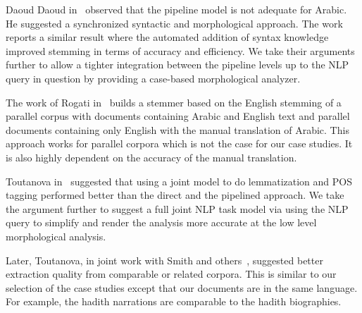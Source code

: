 \documentclass[12pt]{article}
\newcommand{\noTrNoVocRL}[1]{\novocalize\transfalse\RL{#1}\transtrue\vocalize}
\begin{document}
Daoud Daoud in~\cite{Dao09} observed that the pipeline model is not 
adequate for Arabic. 
He suggested a synchronized syntactic and morphological
approach. 
The work~\cite{AlSham08} reports a similar result where
the automated addition of syntax knowledge improved stemming
in terms of accuracy and efficiency. 
We take their arguments further to 
allow a tighter integration between the pipeline
levels up to the NLP query in question by providing a case-based
morphological analyzer. 

The work of Rogati in~\cite{Rog03} builds a stemmer based on
the English stemming of 
a parallel corpus with documents containing Arabic and English
text and parallel documents containing only English with the
manual translation of Arabic. 
This approach works for parallel corpora which is not the case
for our case studies.
It is also highly dependent on the accuracy of the manual translation.

Toutanova in~\cite{Tou09} suggested that using 
a joint model to do lemmatization and POS tagging performed better
than the direct and the pipelined approach. 
We take the argument further to suggest a full joint NLP task 
model via using the NLP query to simplify and render the analysis
more accurate at the low level morphological analysis.

Later, Toutanova, in joint work with Smith and others~\cite{Smi10},
suggested better extraction quality from comparable or related
corpora. 
This is similar to our selection of the case studies
except that our documents are in the same language.
For example, the hadith narrations are comparable to the hadith 
biographies.
\end{document}
